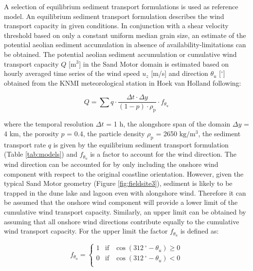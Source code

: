 A selection of equilibrium sediment transport formulations is used as
reference model. An equilibrium sediment transport formulation
describes the wind transport capacity in given conditions. In
conjunction with a shear velocity threshold based on only a constant
uniform median grain size, an estimate of the potential aeolian
sediment accumulation in absence of availability-limitations can be
obtained. The potential aeolian sediment accumulation or cumulative
wind transport capacity $Q$ [$\mathrm{m^3}$] in the Sand Motor domain
is estimated based on hourly averaged time series of the wind speed
$u_z$ [m/s] and direction $\theta_u$ [$^{\circ}$] obtained from the
KNMI meteorological station in Hoek van Holland following:

\begin{equation}
  \label{eq:transport_capacity}
  Q = \sum q \cdot \frac{\Delta t \cdot \Delta y}{(1 - p) \cdot \rho_{\mathrm{p}}} \cdot f_{\theta_u}
\end{equation}

\noindent where the temporal resolution $\Delta t$ = 1 h, the
alongshore span of the domain $\Delta y$ = 4 km, the porosity $p$ =
0.4, the particle density $\rho_{\mathrm{p}}$ = 2650
$\mathrm{kg/m^3}$, the sediment transport rate $q$ is given by the
equilibrium sediment transport formulation (Table \ref{tab:models})
and $f_{\theta_u}$ is a factor to account for the wind direction. The
wind direction can be accounted for by only including the onshore wind
component with respect to the original coastline orientation. However,
given the typical Sand Motor geometry (Figure \ref{fig:fieldsite3}),
sediment is likely to be trapped in the dune lake and lagoon even with
alongshore wind. Therefore it can be assumed that the onshore wind
component will provide a lower limit of the cumulative wind transport
capacity. Similarly, an upper limit can be obtained by assuming that
all onshore wind directions contribute equally to the cumulative wind
transport capacity. For the upper limit the factor $f_{\theta_u}$ is
defined as:

\begin{equation}
  f_{\theta_u} = \left\{
      \begin{array}{rcl}
        1 & \mathrm{if} & \cos \left( 312\,^{\circ} - \theta_u \right) \geq 0 \\
        0 & \mathrm{if} & \cos \left( 312\,^{\circ} - \theta_u \right) < 0 \\
      \end{array}
    \right.
\end{equation}

